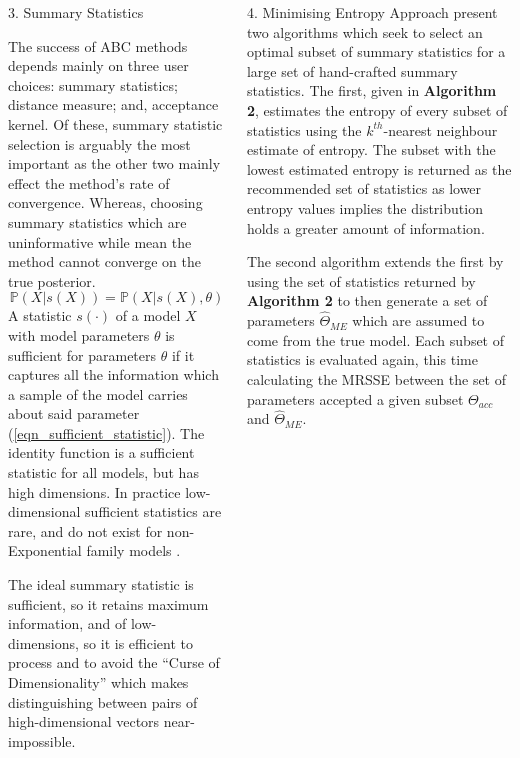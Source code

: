 \documentclass[ %
                  author={Dominic Hutchinson},
                supervisor={Dr. Daniel Lawson \& Dr. Sam Tickle},
                    degree={MEng Maths and Computer Science},
                     title={Bayesian Modelling of Epidemic Events},
                  subtitle={Summary Statistic Selection for Approximate Bayesian Computation Methods},
                      type={},
                      year={2021}
               ]{poster}
\begin{document}
\begin{frame}{}
\begin{columns}[t]
\begin{column}{0.475\linewidth}
      \begin{block}{\Large 3. Summary Statistics}

        The success of ABC methods depends mainly on three user choices: summary statistics; distance measure; and, acceptance kernel. Of these, summary statistic selection is arguably the most important as the other two mainly effect the method's rate of convergence. Whereas, choosing summary statistics which are uninformative while mean the method cannot converge on the true posterior.
        \begin{equation}\label{eqn_sufficient_statistic}
          \mathbb{P}(X|s(X))=\mathbb{P}(X|s(X),\theta)
        \end{equation}
        A statistic $s(\cdot)$ of a model $X$ with model parameters $\theta$ is sufficient for parameters $\theta$ if it captures all the information which a sample of the model carries about said parameter (\ref{eqn_sufficient_statistic}). The identity function is a sufficient statistic for all models, but has high dimensions. In practice low-dimensional sufficient statistics are rare, and do not exist for non-Exponential family models \cite[]{pkd_theorem_pitman_part}.
        \par The ideal summary statistic is sufficient, so it retains maximum information, and of low-dimensions, so it is efficient to process and to avoid the ``Curse of Dimensionality'' which makes distinguishing between pairs of high-dimensional vectors near-impossible.

      \end{block}

    \end{column}

    \begin{column}{0.475\linewidth}

      \begin{block}{\Large 4. Minimising Entropy Approach}
        \cite[]{on_optimal_selection_of_summary_stats_for_ABC} present two algorithms which seek to select an optimal subset of summary statistics for a large set of hand-crafted summary statistics. The first, given in \textbf{Algorithm 2}, estimates the entropy of every subset of statistics using the $k^{th}$-nearest neighbour estimate of entropy. The subset with the lowest estimated entropy is returned as the recommended set of statistics as lower entropy values implies the distribution holds a greater amount of information.
        \par The second algorithm extends the first by using the set of statistics returned by \textbf{Algorithm 2} to then generate a set of parameters $\hat\Theta_{ME}$ which are assumed to come from the true model. Each subset of statistics is evaluated again, this time calculating the MRSSE between the set of parameters accepted a given subset $\Theta_{acc}$ and $\hat\Theta_{ME}$.
      \end{block}


\end{column}
\end{columns}
\end{frame}
\end{document}
